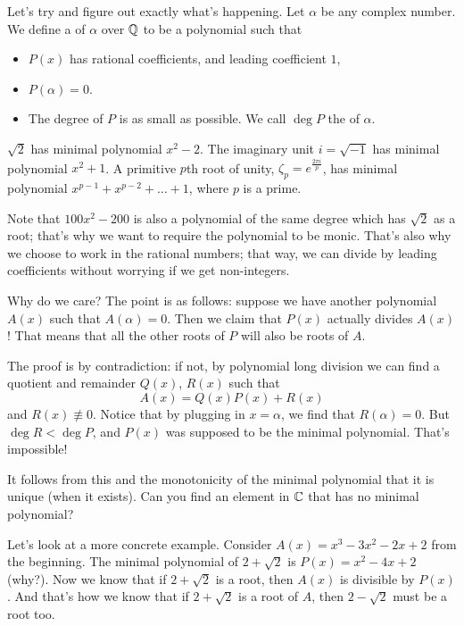 Let's try and figure out exactly what's happening.
Let $\alpha$ be any complex number.
We define a  of $\alpha$ over $\mathbb Q$ to be a polynomial such that
\begin{itemize}
	\item $P(x)$ has rational coefficients, and leading coefficient $1$,
	\item $P(\alpha) = 0$.
	\item The degree of $P$ is as small as possible.
		We call $\deg P$ the  of $\alpha$.
\end{itemize}
\begin{example}
	\listhack
	\begin{enumerate}[(a)]
	\ii $\sqrt 2$ has minimal polynomial $x^2-2$.
	\ii The imaginary unit $i = \sqrt{-1}$ has minimal polynomial $x^2+1$.
	\ii A primitive $p$th root of unity, $\zeta_p = e^{\frac{2\pi i}{p}}$, has minimal polynomial $x^{p-1} + x^{p-2} + \dots + 1$, where $p$ is a prime.
	\end{enumerate}
\end{example}
Note that $100x^2 - 200$ is also a polynomial of the same degree which has $\sqrt 2$ as a root; that's why we want to require the polynomial to be monic. That's also why we choose to work in the rational numbers; that way, we can divide by leading coefficients without worrying if we get non-integers.

Why do we care? The point is as follows: suppose we have another polynomial $A(x)$ such that $A(\alpha) = 0$.
Then we claim that $P(x)$ actually divides $A(x)$!
That means that all the other roots of $P$ will also be roots of $A$.

The proof is by contradiction: if not, by polynomial long division we can find a quotient and remainder $Q(x)$, $R(x)$ such that
\[ A(x) = Q(x) P(x) + R(x) \]
and $R(x) \not\equiv 0$.
Notice that by plugging in $x = \alpha$, we find that $R(\alpha) = 0$.
But $\deg R < \deg P$, and $P(x)$ was supposed to be the minimal polynomial.
That's impossible!

It follows from this and the monotonicity of the minimal polynomial
that it is unique (when it exists). Can you find an element in $\mathbb C$
that has no minimal polynomial?

Let's look at a more concrete example.
Consider $A(x) = x^3-3x^2-2x+2$ from the beginning. 
The minimal polynomial of $2 + \sqrt 2$ is $P(x) = x^2 - 4x + 2$ (why?).
Now we know that if $2 + \sqrt 2$ is a root, then $A(x)$ is divisible by $P(x)$.
And that's how we know that if $2 + \sqrt 2$ is a root of $A$, then $2 - \sqrt 2$ must be a root too.

